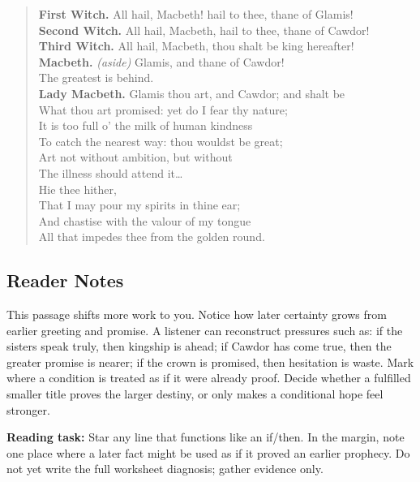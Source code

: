 \documentclass[12pt]{article}
\newenvironment{playpassage}{\begin{quote}\small\setlength{\parskip}{0.12em}\setlength{\parindent}{0pt}}{\end{quote}}
\newcommand{\speaker}[1]{\textbf{#1.}}
\begin{document}
\begin{playpassage}
\speaker{First Witch} All hail, Macbeth! hail to thee, thane of Glamis!\\
\speaker{Second Witch} All hail, Macbeth, hail to thee, thane of Cawdor!\\
\speaker{Third Witch} All hail, Macbeth, thou shalt be king hereafter!\\[0.35em]
\speaker{Macbeth} \textit{(aside)} Glamis, and thane of Cawdor!\\
The greatest is behind.\\[0.35em]
\speaker{Lady Macbeth} Glamis thou art, and Cawdor; and shalt be\\
What thou art promised: yet do I fear thy nature;\\
It is too full o' the milk of human kindness\\
To catch the nearest way: thou wouldst be great;\\
Art not without ambition, but without\\
The illness should attend it\ldots\\
Hie thee hither,\\
That I may pour my spirits in thine ear;\\
And chastise with the valour of my tongue\\
All that impedes thee from the golden round.
\end{playpassage}

\subsection*{Reader Notes}

This passage shifts more work to you. Notice how later certainty grows from earlier greeting and promise. A listener can reconstruct pressures such as: if the sisters speak truly, then kingship is ahead; if Cawdor has come true, then the greater promise is nearer; if the crown is promised, then hesitation is waste. Mark where a condition is treated as if it were already proof. Decide whether a fulfilled smaller title proves the larger destiny, or only makes a conditional hope feel stronger.

\textbf{Reading task:} Star any line that functions like an if/then. In the margin, note one place where a later fact might be used as if it proved an earlier prophecy. Do not yet write the full worksheet diagnosis; gather evidence only.
\end{document}
